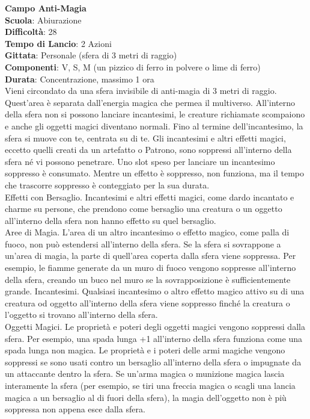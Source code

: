 \begin{multicols}{2}
\medskip\textbf{Campo Anti-Magia}\\
\textbf{Scuola}: Abiurazione\\
\textbf{Difficoltà}:  28\\
\textbf{Tempo di Lancio}: 2 Azioni\\
\textbf{Gittata}: Personale (sfera di 3 metri di raggio)\\
\textbf{Componenti}: V, S, M (un pizzico di ferro in polvere o lime di ferro)\\
\textbf{Durata}: Concentrazione, massimo 1 ora\\
Vieni circondato da una sfera invisibile di anti-magia di 3 metri di raggio. Quest’area è separata dall'energia magica che permea il multiverso. All'interno della sfera non si possono lanciare incantesimi, le creature richiamate scompaiono e anche gli oggetti magici diventano normali. Fino al termine dell'incantesimo, la sfera si muove con te, centrata su di te. Gli incantesimi e altri effetti magici, eccetto quelli creati da un artefatto o Patrono, sono soppressi all'interno della sfera né vi possono penetrare. Uno slot speso per lanciare un incantesimo soppresso è consumato. Mentre un effetto è soppresso, non funziona, ma il tempo che trascorre soppresso è conteggiato per la sua durata. 
\\Effetti con Bersaglio. Incantesimi e altri effetti magici, come dardo incantato e charme su persone, che prendono come bersaglio una creatura o un oggetto all'interno della sfera non hanno effetto su quel bersaglio.
\\Aree di Magia. L’area di un altro incantesimo o effetto magico, come palla di fuoco, non può estendersi all'interno della sfera. Se la sfera si sovrappone a un'area di magia, la parte di quell'area coperta dalla sfera viene soppressa. Per esempio, le fiamme generate da un muro di fuoco vengono soppresse all'interno della sfera, creando un buco nel muro se la sovrapposizione è sufficientemente grande. Incantesimi. Qualsiasi incantesimo o altro effetto magico attivo su di una creatura od oggetto all'interno della sfera viene soppresso finché la creatura o l’oggetto si trovano all'interno della sfera.\\
Oggetti Magici. Le proprietà e poteri degli oggetti magici vengono soppressi dalla sfera. Per esempio, una spada lunga +1 all'interno della sfera funziona come una spada lunga non magica. Le proprietà e i poteri delle armi magiche vengono soppressi se sono usati contro un bersaglio all'interno  della sfera o impugnate da un attaccante dentro la sfera. Se un'arma magica o munizione magica lascia interamente la sfera (per esempio, se tiri una freccia magica o scagli una lancia magica a un bersaglio al di fuori della sfera), la magia dell'oggetto non è più soppressa non appena esce dalla sfera.

\end{multicols}
